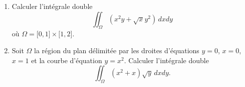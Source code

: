 
\begin{exercice}\label{exoOutilsMath-0118}

    \begin{enumerate}
        \item
            Calculer l'intégrale double
            \begin{equation}
                \iint_{\Omega}(x^2y+\sqrt{x}y^2)\,dxdy
            \end{equation}
            où \( \Omega=\mathopen[ 0 , 1 \mathclose]\times\mathopen[ 1 , 2 \mathclose]\).

        \item
            Soit \( \Omega\) la région du plan délimitée par les droites d'équations \( y=0\), \( x=0\), \( x=1\) et la courbe d'équation \( y=x^2\). Calculer l'intégrale double
            \begin{equation}
                \iint_{\Omega}(x^2+x)\sqrt{y}\,dxdy.
            \end{equation}
            
    \end{enumerate}
    

\end{exercice}
